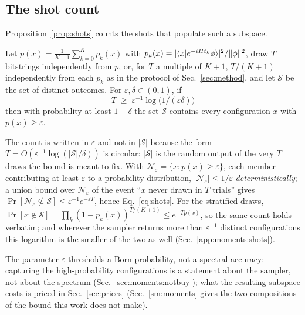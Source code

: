 \subsection{The shot count}
\label{sec:moments:shots}

Proposition~\ref{prop:shots} counts the shots that populate such a subspace.

\begin{proposition}
\label{prop:shots}
Let $p(x)=\tfrac{1}{K+1}\sum_{k=0}^{K}p_k(x)$ with
$p_k(x)=\lvert\langle x|e^{-iHt_k}\phi \rangle\rvert^{2}/\lVert\phi\rVert^{2}$, draw $T$ bitstrings
independently from $p$, or, for $T$ a multiple of $K{+}1$, $T/(K{+}1)$ independently from each $p_k$ as in the protocol of
Sec.~\ref{sec:method}, and let $\mathcal S$ be the set of distinct outcomes. For
$\varepsilon,\delta\in(0,1)$, if
\begin{equation}
T\;\ge\;\varepsilon^{-1}\log\!\bigl(1/(\varepsilon\delta)\bigr)
\label{eq:shots}
\end{equation}
then with probability at least $1-\delta$ the set $\mathcal S$ contains every configuration $x$ with
$p(x)\ge\varepsilon$.
\end{proposition}

The count is written in $\varepsilon$ and not in $|\mathcal S|$ because the form
$T=O(\varepsilon^{-1}\log(|\mathcal S|/\delta))$ is circular: $|\mathcal S|$ is the random output of
the very $T$ draws the bound is meant to fix. With $\mathcal N_\varepsilon=\{x:p(x)\ge\varepsilon\}$,
each member contributing at least $\varepsilon$ to a probability distribution,
$|\mathcal N_\varepsilon|\le1/\varepsilon$ \emph{deterministically}; a union bound over
$\mathcal N_\varepsilon$ of the event ``$x$ never drawn in $T$ trials'' gives
$\Pr[\mathcal N_\varepsilon\not\subseteq\mathcal S]\le\varepsilon^{-1}e^{-\varepsilon T}$, hence
Eq.~\eqref{eq:shots}. For the stratified draws, $\Pr[x\notin\mathcal S]=\prod_k(1-p_k(x))^{T/(K+1)}\le
e^{-Tp(x)}$, so the same count holds verbatim; and wherever the sampler returns more than
$\varepsilon^{-1}$ distinct configurations this logarithm is the smaller of the two as well
(Sec.~\ref{app:moments:shots}).

The parameter $\varepsilon$ thresholds a Born probability, not a spectral accuracy: capturing the
high-probability configurations is a statement about the sampler, not about the spectrum
(Sec.~\ref{sec:moments:notbuy}); what the resulting subspace costs is priced in
Sec.~\ref{sec:prices} (Sec.~\ref{sm:moments} gives the two compositions of the bound this work does not
make).

